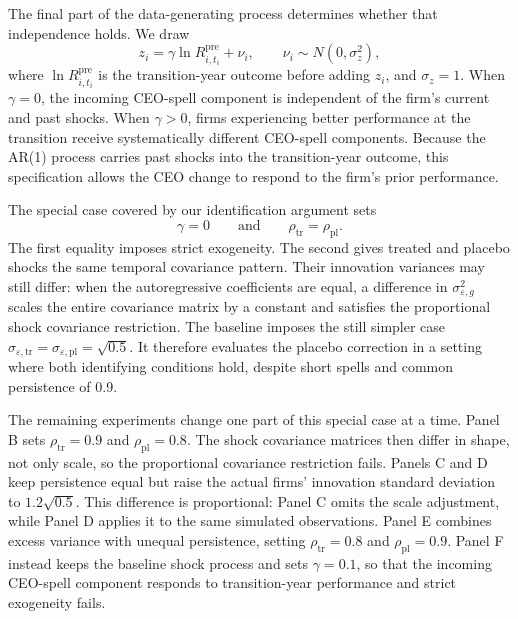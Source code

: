 \documentclass[sigconf,nonacm]{acmart}
\begin{document}
The final part of the data-generating process determines whether that independence holds. We draw
\begin{equation}
z_i
=
\gamma \ln R_{i,t_i}^{\mathrm{pre}}
+
\nu_i,
\qquad
\nu_i
\sim
N\!\left(0,\sigma_z^2\right),
\label{eq:mc_ceo_assignment}
\end{equation}
where \(\ln R_{i,t_i}^{\mathrm{pre}}\) is the transition-year outcome before adding \(z_i\), and \(\sigma_z=1\). When \(\gamma=0\), the incoming CEO-spell component is independent of the firm's current and past shocks. When \(\gamma>0\), firms experiencing better performance at the transition receive systematically different CEO-spell components. Because the AR(1) process carries past shocks into the transition-year outcome, this specification allows the CEO change to respond to the firm's prior performance.

The special case covered by our identification argument sets
\begin{equation}
\gamma=0
\qquad\text{and}\qquad
\rho_{\mathrm{tr}}=\rho_{\mathrm{pl}}.
\label{eq:mc_identified_case}
\end{equation}
The first equality imposes strict exogeneity. The second gives treated and placebo shocks the same temporal covariance pattern. Their innovation variances may still differ: when the autoregressive coefficients are equal, a difference in \(\sigma_{\varepsilon,g}^{2}\) scales the entire covariance matrix by a constant and satisfies the proportional shock covariance restriction. The baseline imposes the still simpler case \(\sigma_{\varepsilon,\mathrm{tr}}=\sigma_{\varepsilon,\mathrm{pl}}=\sqrt{0.5}\). It therefore evaluates the placebo correction in a setting where both identifying conditions hold, despite short spells and common persistence of 0.9.

The remaining experiments change one part of this special case at a time. Panel B sets \(\rho_{\mathrm{tr}}=0.9\) and \(\rho_{\mathrm{pl}}=0.8\). The shock covariance matrices then differ in shape, not only scale, so the proportional covariance restriction fails. Panels C and D keep persistence equal but raise the actual firms' innovation standard deviation to \(1.2\sqrt{0.5}\). This difference is proportional: Panel C omits the scale adjustment, while Panel D applies it to the same simulated observations. Panel E combines excess variance with unequal persistence, setting \(\rho_{\mathrm{tr}}=0.8\) and \(\rho_{\mathrm{pl}}=0.9\). Panel F instead keeps the baseline shock process and sets \(\gamma=0.1\), so that the incoming CEO-spell component responds to transition-year performance and strict exogeneity fails.
\end{document}
